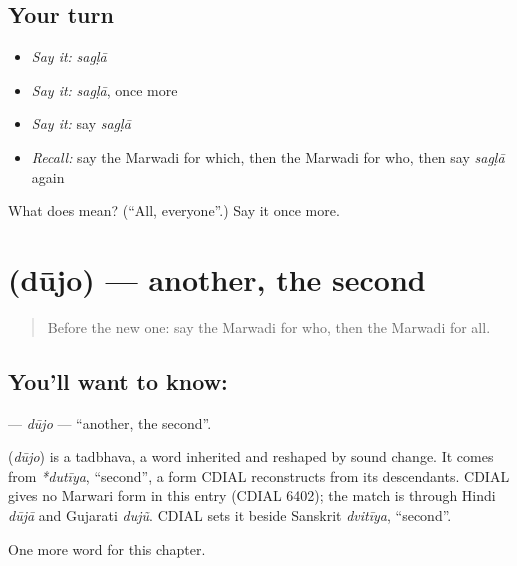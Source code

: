 \subsection*{Your turn}
\begin{itemize}
\raggedright
  \item \emph{Say it:} \emph{sagḷā}
  \item \emph{Say it:} \emph{sagḷā}, once more
  \item \emph{Say it:} say \emph{sagḷā}
  \item \emph{Recall:} say the Marwadi for which, then the Marwadi for who, then say \emph{sagḷā} again
\end{itemize}

\begin{tcolorbox}[breakable,colback=teal!4,colframe=teal!35!black,title={Before you move on}]
What does  mean? (\textquotedblleft{}All, everyone\textquotedblright{}.) Say it once more.
\end{tcolorbox}
\section[\texorpdfstring{\mw{दूजो} (dūjo)}{दूजो (dūjo)}]{ (dūjo) — another, the second}

\label{lesson:MW-C102-dujo}



\begin{quote}
Before the new one: say the Marwadi for who, then the Marwadi for all.
\end{quote}

\subsection*{You'll want to know: }
\textbf{} — \emph{dūjo} — \textquotedblleft{}another, the second\textquotedblright{}.

\begin{cousinweb}
\textbf{} (\emph{dūjo}) is a tadbhava, a word inherited and reshaped by sound change. It comes from \emph{*dutīya}, \textquotedblleft{}second\textquotedblright{}, a form CDIAL reconstructs from its descendants. CDIAL gives no Marwari form in this entry (CDIAL 6402); the match is through Hindi \emph{dūjā} and Gujarati \emph{dujũ}. CDIAL sets it beside Sanskrit \emph{dvitīya}, \textquotedblleft{}second\textquotedblright{}.
\end{cousinweb}

\begin{grammarlens}[title={What you've built}]
One more word for this chapter.
\end{grammarlens}


